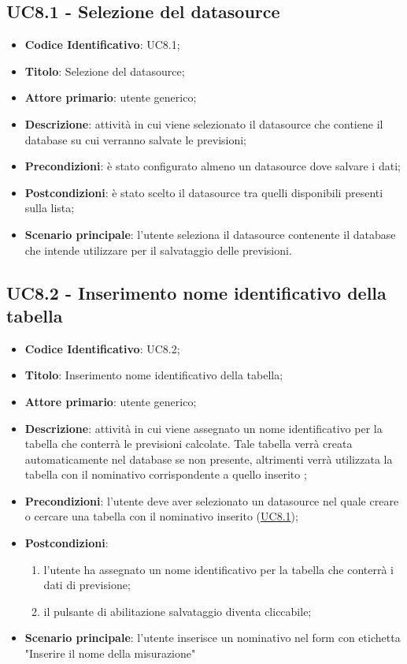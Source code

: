		\label{par:U8.1}
	\subsection{UC8.1 - Selezione del datasource}
		\begin{itemize}
			\item\textbf{Codice Identificativo}: UC8.1;
			\item\textbf{Titolo}: Selezione del datasource;
			\item\textbf{Attore primario}: utente generico;
			\item\textbf{Descrizione}: attività in cui viene selezionato il datasource che contiene il database su cui verranno salvate le previsioni;
			\item\textbf{Precondizioni}: è stato configurato almeno un datasource dove salvare i dati;
			\item\textbf{Postcondizioni}: è stato scelto il datasource tra quelli disponibili presenti sulla lista;
			\item\textbf{Scenario principale}: l'utente seleziona il datasource contenente il database che intende utilizzare per il salvataggio delle previsioni.
		\end{itemize}
		
	\label{par:UC8.2}
	\subsection{UC8.2 - Inserimento nome identificativo della tabella}
		\begin{itemize}
			\item\textbf{Codice Identificativo}: UC8.2;
			\item\textbf{Titolo}: Inserimento nome identificativo della tabella;
			\item\textbf{Attore primario}: utente generico;
			\item\textbf{Descrizione}: attività in cui viene assegnato un nome identificativo per la tabella che conterrà le previsioni calcolate. Tale tabella verrà creata automaticamente nel database se non presente, altrimenti verrà utilizzata la tabella con il nominativo corrispondente a quello inserito ;
			\item\textbf{Precondizioni}: l'utente deve aver selezionato un datasource nel quale creare o cercare una tabella con il nominativo inserito (\hyperref[par:UC8.1]{UC8.1});
			\item\textbf{Postcondizioni}:
			\begin{enumerate}
			\item l'utente ha assegnato un nome identificativo per la tabella che conterrà i dati di previsione;
			\item il pulsante di abilitazione salvataggio diventa cliccabile;
 			\end{enumerate}			
		
			\item\textbf{Scenario principale}: l'utente inserisce un nominativo nel form con etichetta "Inserire il nome della misurazione"
		\end{itemize}
		
